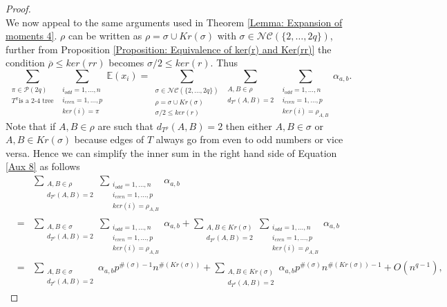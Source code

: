 \documentclass[10pt,a4paper]{amsart}
\newcommand{\E}{\mathbb{E}}
\newcommand{\NC}{\mathcal{NC}}
\newcommand{\cP}{\mathcal{P}}
\begin{document}
\begin{proof}
\begin{equation*}
\end{equation*}
We now appeal to the same arguments used in Theorem \ref{Lemma: Expansion of moments 4}. $\rho$ can be written as $\rho=\sigma\cup Kr(\sigma)$ with $\sigma\in \NC(\{2,\dots,2q\})$, further from Proposition \ref{Proposition: Equivalence of ker(r) and Ker(rr)} the condition $\overline{\rho}\leq ker(rr)$ becomes $\sigma/2 \leq ker(r)$. Thus
\begin{equation}\label{Aux 8}
\sum_{\substack{\pi\in \cP(2q)\\ T^\pi \text{is a 2-4 tree} }}\sum_{\substack{i_{odd}=1,\dots,n \\ i_{even}=1,\dots,p \\ ker(i)=\pi}}\E(x_i)= \sum_{\substack{\sigma\in \NC(\{2,\dots,2q\}) \\ \rho=\sigma\cup Kr(\sigma) \\ \sigma/2\leq ker(r)}}\sum_{\substack{A,B\in\rho \\ d_{T^\rho}(A,B)=2}}\sum_{\substack{i_{odd}=1,\dots,n \\ i_{even}=1,\dots,p \\ ker(i)=\rho_{A,B}}}\alpha_{a,b}.
\end{equation}
Note that if $A,B\in \rho$ are such that $d_{T^\rho}(A,B)=2$ then either $A,B\in \sigma$ or $A,B\in Kr(\sigma)$ because edges of $T$ always go from even to odd numbers or vice versa. Hence we can simplify the inner sum in the right hand side of Equation \ref{Aux 8} as follows
\begin{eqnarray*}
&&\sum_{\substack{A,B\in \rho \\ d_{T^\rho}(A,B)=2}}\sum_{\substack{i_{odd}=1,\dots,n \\ i_{even}=1,\dots,p \\ ker(i)=\rho_{A,B}}}\alpha_{a,b} \\
&=& \sum_{\substack{A,B\in \sigma \\ d_{T^\rho}(A,B)=2}}\sum_{\substack{i_{odd}=1,\dots,n \\ i_{even}=1,\dots,p \\ ker(i)=\rho_{A,B}}}\alpha_{a,b} + \sum_{\substack{A,B\in Kr(\sigma) \\ d_{T^\rho}(A,B)=2}}\sum_{\substack{i_{odd}=1,\dots,n \\ i_{even}=1,\dots,p \\ ker(i)=\rho_{A,B}}}\alpha_{a,b} \\
&=& \sum_{\substack{A,B\in \sigma \\ d_{T^\rho}(A,B)=2}}\alpha_{a,b}p^{\#(\sigma)-1}n^{\#(Kr(\sigma))} + \sum_{\substack{A,B\in Kr(\sigma) \\ d_{T^\rho}(A,B)=2}}\alpha_{a,b}p^{\#(\sigma)}n^{\#(Kr(\sigma))-1}+O(n^{q-1}), 

\end{eqnarray*}
\end{proof}
\end{document}
